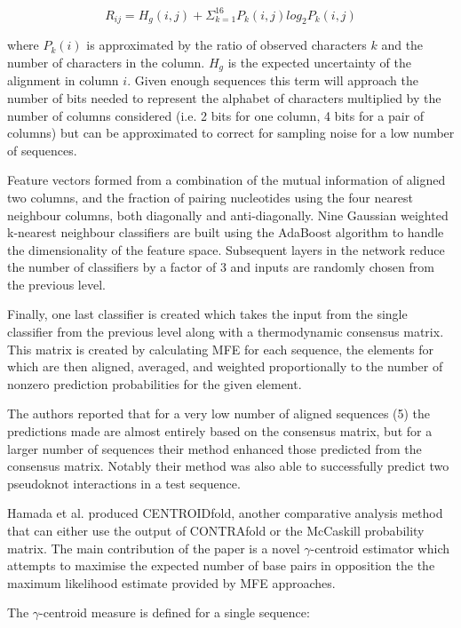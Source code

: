 \documentclass[journal]{IEEEtran}
\begin{document}
\begin{equation}
	R_{ij} = H_g(i, j) + \Sigma_{k=1}^{16} P_k(i, j) log_2 P_k(i, j)
\end{equation}

where $P_k(i)$ is approximated by the ratio of observed characters $k$ and the  number of characters in the column. $H_g$ is the expected uncertainty of the alignment in column $i$. Given enough sequences this term will approach the number of bits needed to represent the alphabet of characters multiplied by the number of columns considered (i.e. 2 bits for one column, 4 bits for a pair of columns) but can be approximated to correct for sampling noise for a low number of sequences.

Feature vectors formed from a combination of the mutual information of aligned two columns, and the fraction of pairing nucleotides using the four nearest neighbour columns, both diagonally and anti-diagonally. Nine Gaussian weighted k-nearest neighbour classifiers are built using the AdaBoost algorithm to handle the dimensionality of the feature space. Subsequent layers in the network reduce the number of classifiers by a factor of 3 and inputs are randomly chosen from the previous level. 

Finally, one last classifier is created which takes the input from the single classifier from the previous level along with a thermodynamic consensus matrix. This matrix is created by calculating MFE for each sequence, the elements for which are then aligned, averaged, and weighted proportionally to the number of nonzero prediction probabilities for the given element.

The authors reported that for a very low number of aligned sequences (5) the predictions made are almost entirely based on the consensus matrix, but for a larger number of sequences their method enhanced those predicted from the consensus matrix. Notably their method was also able to successfully predict two pseudoknot interactions in a test sequence.

Hamada et al. \cite{hamada2009prediction, sato2009centroidfold} produced CENTROIDfold, another comparative analysis method that can either use the output of CONTRAfold or the McCaskill probability matrix. The main contribution of the paper is a novel $\gamma$-centroid estimator which attempts to maximise the expected number of base pairs in opposition the the maximum likelihood estimate provided by MFE approaches. 

The $\gamma$-centroid measure is defined for a single sequence:
\end{document}

